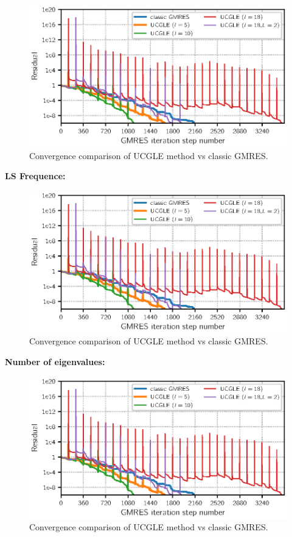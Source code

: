 \begin{figure}[htbp]
	\centering
	\includegraphics[width=6.2in]{fig/conv2.eps}
	\caption{Convergence comparison of UCGLE method vs classic GMRES.}
	\label{fig:Lsappliedtime}
\end{figure}

\textbf{LS Frequence:}

\begin{figure}[htbp]
	\centering
	\includegraphics[width=6.2in]{fig/conv2.eps}
	\caption{Convergence comparison of UCGLE method vs classic GMRES.}
	\label{fig:Lsfreq}
\end{figure}

\textbf{Number of eigenvalues: }

\begin{figure}[htbp]
	\centering
	\includegraphics[width=6.2in]{fig/conv2.eps}
	\caption{Convergence comparison of UCGLE method vs classic GMRES.}
	\label{fig:vals}
\end{figure}

